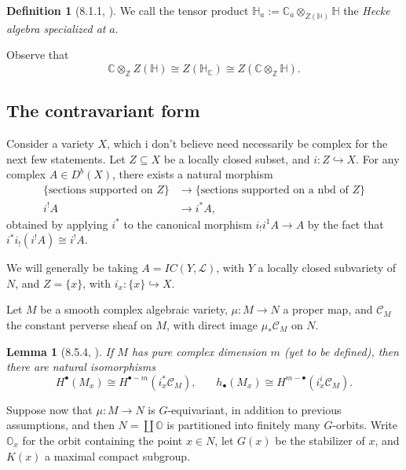 \documentclass{memoir}
\newcommand{\mc}{\mathcal}
\newcommand{\mb}{\mathbb}
\newcommand{\bc}{\mathbb{C}}
\newcommand{\bz}{\mathbb{Z}}
\newcommand{\tx}{\text}
\newcommand{\ten}{\otimes}
\newtheorem{lemma}[theorem]{Lemma}
\theoremstyle{definition}
\newtheorem{definition}[theorem]{Definition}
\begin{document}
	\begin{definition}[8.1.1, \cite{Chr}]
		We call the tensor product $\mb{H}_a:=\bc_a\ten_{Z(\mb{H})}\mb{H}$ the \emph{Hecke algebra specialized at } $a$. 
	\end{definition}

	Observe that 
	$$\bc\ten_{\bz}Z(\mb{H})\cong Z(\mb{H}_\bc)\cong Z(\bc\ten_{\bz}\mb{H}).$$
	
	
	
	
	
	
	
	
	
	
	
	
	
	
	
	
	
	
	
	

	\subsection{The contravariant form}
	
	Consider a variety $X$, which i don't believe need necessarily be complex for the next few statements.  
	Let $Z\subseteq X$ be a locally closed subset, and $i:Z\hookrightarrow X$.
	For any complex $A\in D^b(X)$, there exists a natural morphism
	\begin{align*}
		\{\tx{sections supported on } Z\}&\to \{\tx{sections supported on a nbd of } Z\}\\
		i^!A&\to i^\ast A,
	\end{align*}
%
	obtained by applying $i^\ast$ to the canonical morphism $i_!i^1A\to A$ by the fact that $i^\ast i_!(i^!A)\cong i^!A$.
	
	We will generally be taking $A=IC(Y, \mc{L})$, with $Y$ a locally closed subvariety of $N$, and $Z=\{x\}$, with $i_x:\{x\}\hookrightarrow X$.  
	
	Let $M$ be a smooth complex algebraic variety, $\mu:M\to N$ a proper map, and $\mc{C}_M$ the constant perverse sheaf on $M$, with direct image $\mu_\ast\mc{C}_M$ on $N$.   
	
	\begin{lemma}[8.5.4, \cite{Chr}]
		If $M$ has pure complex dimension $m$ (yet to be defined), then there are natural isomorphisms
		$$H^\bullet(M_x)\cong H^{\bullet-m}(i_x^\ast\mc{C}_M), \ \ \ \ \ \ \ \ h_\bullet(M_x)\cong H^{m-\bullet}(i_x^i\mc{C}_M).$$
	\end{lemma}

	Suppose now that $\mu:M\to N$ is $G$-equivariant, in addition to previous assumptions, and then $N=\coprod \mb{O}$ is partitioned into finitely many $G$-orbits.  
	Write $\mb{O}_x$ for the orbit containing the point $x\in N$, let $G(x)$ be the stabilizer of $x$, and $K(x)$ a maximal compact subgroup. 
	
\end{document}
